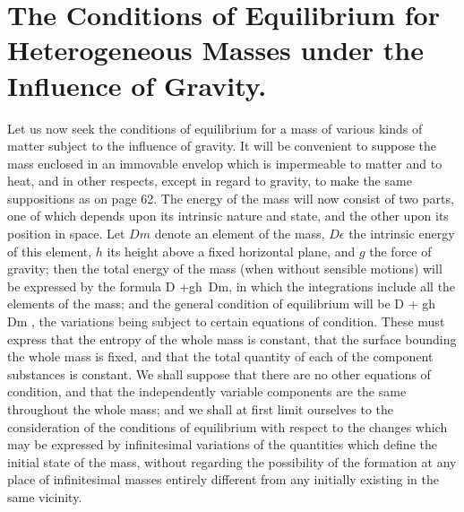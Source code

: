 \documentclass[12pt]{article}
\begin{document}
\section{The Conditions of Equilibrium for Heterogeneous Masses under the Influence of Gravity.}

Let us now seek the conditions of equilibrium for a mass of various kinds of matter subject to the influence of gravity. It will be convenient to suppose the mass enclosed in an immovable envelop which is impermeable to matter and to heat, and in other respects, except in regard to gravity, to make the same suppositions as on page 62. The energy of the mass will now consist of two parts, one of which depends upon its intrinsic nature and state, and the other upon its position in space. Let $Dm$ denote an element of the mass, $D\epsilon$ the intrinsic energy of this element, $h$ its height above a fixed horizontal plane, and $g$ the force of gravity; then the total energy of the mass (when without sensible motions) will be expressed by the formula
\eqs \int D \epsilon +\int gh \,Dm,    \label{219}\eqe
in which the integrations include all the elements of the mass; and the general condition of equilibrium will be
\eqs  \delta \int D \epsilon + \delta \int gh \, Dm ,  \label{220}\eqe
the variations being subject to certain equations of condition. These must express that the entropy of the whole mass is constant, that the surface bounding the whole mass is fixed, and that the total quantity of each of the component substances is constant. We shall suppose that there are no other equations of condition, and that the independently variable components are the same throughout the whole mass; and we shall at first limit ourselves to the consideration of the conditions of equilibrium with respect to the changes which may be expressed by infinitesimal variations of the quantities which define the initial state of the mass, without regarding the possibility of the formation at any place of infinitesimal masses entirely different from any initially existing in the same vicinity.
\end{document}
